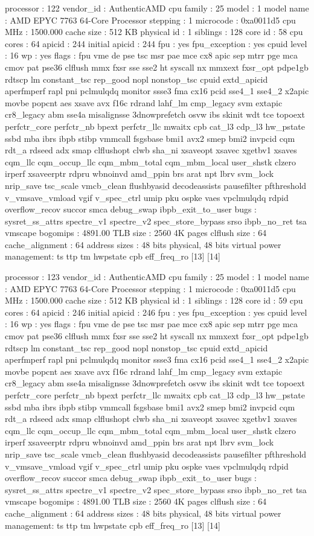 processor	: 122
vendor_id	: AuthenticAMD
cpu family	: 25
model		: 1
model name	: AMD EPYC 7763 64-Core Processor
stepping	: 1
microcode	: 0xa0011d5
cpu MHz		: 1500.000
cache size	: 512 KB
physical id	: 1
siblings	: 128
core id		: 58
cpu cores	: 64
apicid		: 244
initial apicid	: 244
fpu		: yes
fpu_exception	: yes
cpuid level	: 16
wp		: yes
flags		: fpu vme de pse tsc msr pae mce cx8 apic sep mtrr pge mca cmov pat pse36 clflush mmx fxsr sse sse2 ht syscall nx mmxext fxsr_opt pdpe1gb rdtscp lm constant_tsc rep_good nopl nonstop_tsc cpuid extd_apicid aperfmperf rapl pni pclmulqdq monitor ssse3 fma cx16 pcid sse4_1 sse4_2 x2apic movbe popcnt aes xsave avx f16c rdrand lahf_lm cmp_legacy svm extapic cr8_legacy abm sse4a misalignsse 3dnowprefetch osvw ibs skinit wdt tce topoext perfctr_core perfctr_nb bpext perfctr_llc mwaitx cpb cat_l3 cdp_l3 hw_pstate ssbd mba ibrs ibpb stibp vmmcall fsgsbase bmi1 avx2 smep bmi2 invpcid cqm rdt_a rdseed adx smap clflushopt clwb sha_ni xsaveopt xsavec xgetbv1 xsaves cqm_llc cqm_occup_llc cqm_mbm_total cqm_mbm_local user_shstk clzero irperf xsaveerptr rdpru wbnoinvd amd_ppin brs arat npt lbrv svm_lock nrip_save tsc_scale vmcb_clean flushbyasid decodeassists pausefilter pfthreshold v_vmsave_vmload vgif v_spec_ctrl umip pku ospke vaes vpclmulqdq rdpid overflow_recov succor smca debug_swap ibpb_exit_to_user
bugs		: sysret_ss_attrs spectre_v1 spectre_v2 spec_store_bypass srso ibpb_no_ret tsa vmscape
bogomips	: 4891.00
TLB size	: 2560 4K pages
clflush size	: 64
cache_alignment	: 64
address sizes	: 48 bits physical, 48 bits virtual
power management: ts ttp tm hwpstate cpb eff_freq_ro [13] [14]

processor	: 123
vendor_id	: AuthenticAMD
cpu family	: 25
model		: 1
model name	: AMD EPYC 7763 64-Core Processor
stepping	: 1
microcode	: 0xa0011d5
cpu MHz		: 1500.000
cache size	: 512 KB
physical id	: 1
siblings	: 128
core id		: 59
cpu cores	: 64
apicid		: 246
initial apicid	: 246
fpu		: yes
fpu_exception	: yes
cpuid level	: 16
wp		: yes
flags		: fpu vme de pse tsc msr pae mce cx8 apic sep mtrr pge mca cmov pat pse36 clflush mmx fxsr sse sse2 ht syscall nx mmxext fxsr_opt pdpe1gb rdtscp lm constant_tsc rep_good nopl nonstop_tsc cpuid extd_apicid aperfmperf rapl pni pclmulqdq monitor ssse3 fma cx16 pcid sse4_1 sse4_2 x2apic movbe popcnt aes xsave avx f16c rdrand lahf_lm cmp_legacy svm extapic cr8_legacy abm sse4a misalignsse 3dnowprefetch osvw ibs skinit wdt tce topoext perfctr_core perfctr_nb bpext perfctr_llc mwaitx cpb cat_l3 cdp_l3 hw_pstate ssbd mba ibrs ibpb stibp vmmcall fsgsbase bmi1 avx2 smep bmi2 invpcid cqm rdt_a rdseed adx smap clflushopt clwb sha_ni xsaveopt xsavec xgetbv1 xsaves cqm_llc cqm_occup_llc cqm_mbm_total cqm_mbm_local user_shstk clzero irperf xsaveerptr rdpru wbnoinvd amd_ppin brs arat npt lbrv svm_lock nrip_save tsc_scale vmcb_clean flushbyasid decodeassists pausefilter pfthreshold v_vmsave_vmload vgif v_spec_ctrl umip pku ospke vaes vpclmulqdq rdpid overflow_recov succor smca debug_swap ibpb_exit_to_user
bugs		: sysret_ss_attrs spectre_v1 spectre_v2 spec_store_bypass srso ibpb_no_ret tsa vmscape
bogomips	: 4891.00
TLB size	: 2560 4K pages
clflush size	: 64
cache_alignment	: 64
address sizes	: 48 bits physical, 48 bits virtual
power management: ts ttp tm hwpstate cpb eff_freq_ro [13] [14]

